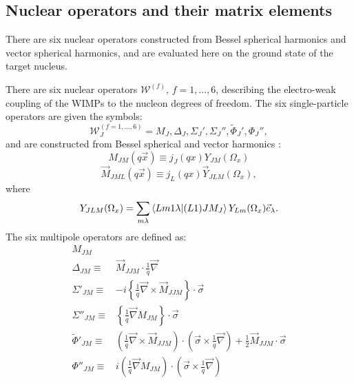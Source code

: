 \documentclass[
14pt, %
a4paper, %
oneside, %
headinclude,footinclude, %
BCOR5mm, %
]{scrartcl}
\begin{document}
\subsection{Nuclear operators and their matrix elements}
There are six nuclear operators constructed from Bessel 
spherical harmonics and vector spherical harmonics, and are evaluated here on 
the ground state of the target nucleus.

There are six nuclear operators $\mathcal{W}^{(f)}$, $f=1,...,6$, describing the electro-weak coupling of the WIMPs to the nucleon degrees of freedom. The six single-particle operators are given the symbols:
\begin{equation}
    \mathcal{W}^{(f=1,...,6)}_J=M_J, \Delta_J, \Sigma_J', \Sigma_J'', \tilde{\Phi}_J', \Phi_J'',
\end{equation}
and are constructed from Bessel spherical and vector harmonics \cite{DONNELLY1979103}:
\begin{dmath}
    M_{JM}(q\vec{x})\equiv j_J(qx)Y_{JM}(\Omega_x)
\end{dmath}
\begin{dmath}
    \vec{M}_{JML}(q\vec{x}) \equiv j_L(qx) \vec{Y}_{JLM}(\Omega_x),
\end{dmath}
where
\begin{dmath}
    Y_{JLM}(\Omega_x) = \sum_{m\lambda} \bra{Lm1\lambda}\ket{(L1)JM_J} Y_{Lm}(\Omega_x)\vec{e}_\lambda.
\end{dmath}
The six multipole operators are defined as:
\begin{align}
    \label{oplist}
M_{JM}\ \ &\\
\Delta_{JM} \equiv& \vec{M}_{JJM}\cdot \frac{1}{q}\vec{\nabla}\\
\Sigma'_{JM} \equiv& -i \left \{\frac{1}{q}\vec{\nabla}\times \vec{M}_{JJM}  \right\}\cdot \vec{\sigma}\\
\Sigma''_{JM} \equiv& \left \{ \frac{1}{q}\vec{\nabla}M_{JM} \right \}\cdot \vec{\sigma}\\
\tilde{\Phi}'_{JM} \equiv& \left( \frac{1}{q} \vec{\nabla} \times \vec{M}_{JJM}\right)\cdot \left(\vec{\sigma}\times \frac{1}{q}\vec{\nabla} \right) + \frac{1}{2}\vec{M}_{JJM}\cdot \vec{\sigma}\\
\Phi''_{JM}\equiv& i\left(\frac{1}{q}\vec{\nabla}M_{JM} \right)\cdot \left(\vec{\sigma}\times \frac{1}{q}\vec{\nabla} \right)
\end{align}
\end{document}
